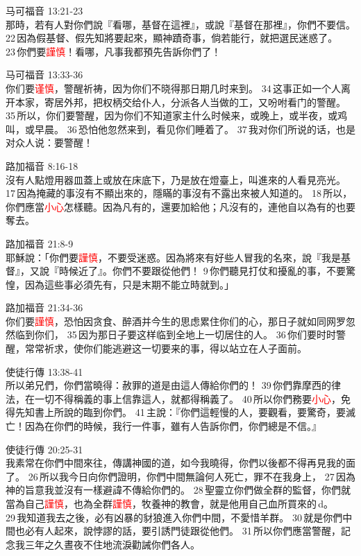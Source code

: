马可福音 13:21-23\\
那時，若有人對你們說『看哪，基督在這裡』，或說『基督在那裡』，你們不要信。 22 因為假基督、假先知將要起來，顯神蹟奇事，倘若能行，就把選民迷惑了。 23 你們要\textcolor{red}{謹慎}！看哪，凡事我都預先告訴你們了！

马可福音 13:33-36\\
你们要\textcolor{red}{谨慎}，警醒祈祷，因为你们不晓得那日期几时来到。 34 这事正如一个人离开本家，寄居外邦，把权柄交给仆人，分派各人当做的工，又吩咐看门的警醒。 35 所以，你们要警醒，因为你们不知道家主什么时候来，或晚上，或半夜，或鸡叫，或早晨。 36 恐怕他忽然来到，看见你们睡着了。 37 我对你们所说的话，也是对众人说：要警醒！

路加福音 8:16-18\\
沒有人點燈用器皿蓋上或放在床底下，乃是放在燈臺上，叫進來的人看見亮光。 17 因為掩藏的事沒有不顯出來的，隱瞞的事沒有不露出來被人知道的。 18 所以，你們應當\textcolor{red}{小心}怎樣聽。因為凡有的，還要加給他；凡沒有的，連他自以為有的也要奪去。

路加福音 21:8-9\\
耶穌說：「你們要\textcolor{red}{謹慎}，不要受迷惑。因為將來有好些人冒我的名來，說『我是基督』，又說『時候近了』。你們不要跟從他們！ 9 你們聽見打仗和擾亂的事，不要驚惶，因為這些事必須先有，只是末期不能立時就到。」

路加福音 21:34-36\\
你们要\textcolor{red}{謹慎}，恐怕因贪食、醉酒并今生的思虑累住你们的心，那日子就如同网罗忽然临到你们， 35 因为那日子要这样临到全地上一切居住的人。 36 你们要时时警醒，常常祈求，使你们能逃避这一切要来的事，得以站立在人子面前。

使徒行傳 13:38-41\\
所以弟兄們，你們當曉得：赦罪的道是由這人傳給你們的！ 39 你們靠摩西的律法，在一切不得稱義的事上信靠這人，就都得稱義了。 40 所以你們務要\textcolor{red}{小心}，免得先知書上所說的臨到你們。 41 主說：『你們這輕慢的人，要觀看，要驚奇，要滅亡！因為在你們的時候，我行一件事，雖有人告訴你們，你們總是不信。』

使徒行傳 20:25-31\\
我素常在你們中間來往，傳講神國的道，如今我曉得，你們以後都不得再見我的面了。 26 所以我今日向你們證明，你們中間無論何人死亡，罪不在我身上， 27 因為神的旨意我並沒有一樣避諱不傳給你們的。 28 聖靈立你們做全群的監督，你們就當為自己\textcolor{red}{謹慎}，也為全群\textcolor{red}{謹慎}，牧養神的教會，就是他用自己血所買來的 d。 29 我知道我去之後，必有凶暴的豺狼進入你們中間，不愛惜羊群。 30 就是你們中間也必有人起來，說悖謬的話，要引誘門徒跟從他們。 31 所以你們應當警醒，記念我三年之久晝夜不住地流淚勸誡你們各人。

